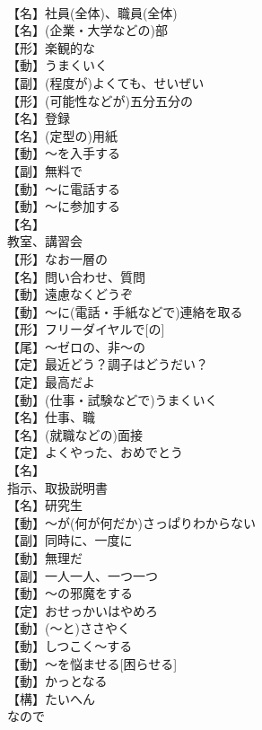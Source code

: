\documentclass[8pt]{extreport}
\begin{document}
\begin{CJK}{UTF8}{min}
\\	【名】社員(全体)、職員(全体)
\\	【名】(企業・大学などの)部
\\	【形】楽観的な
\\	【動】うまくいく
\\	【副】(程度が)よくても、せいぜい
\\	【形】(可能性などが)五分五分の
\\	【名】登録
\\	【名】(定型の)用紙
\\	【動】～を入手する
\\	【副】無料で
\\	【動】～に電話する
\\	【動】～に参加する
\\	【名】
\\	教室、講習会
\\	【形】なお一層の
\\	【名】問い合わせ、質問
\\	【動】遠慮なくどうぞ
\\	【動】～に(電話・手紙などで)連絡を取る
\\	【形】フリーダイヤルで[の]
\\	【尾】～ゼロの、非～の
\\	【定】最近どう？調子はどうだい？
\\	【定】最高だよ
\\	【動】(仕事・試験などで)うまくいく
\\	【名】仕事、職
\\	【名】(就職などの)面接
\\	【定】よくやった、おめでとう
\\	【名】
\\	指示、取扱説明書
\\	【名】研究生
\\	【動】～が(何が何だか)さっぱりわからない
\\	【副】同時に、一度に
\\	【動】無理だ
\\	【副】一人一人、一つ一つ
\\	【動】～の邪魔をする
\\	【定】おせっかいはやめろ
\\	【動】(～と)ささやく
\\	【動】しつこく～する
\\	【動】～を悩ませる[困らせる]
\\	【動】かっとなる
\\	【構】たいへん
\\	なので

\end{CJK}
\end{document}

